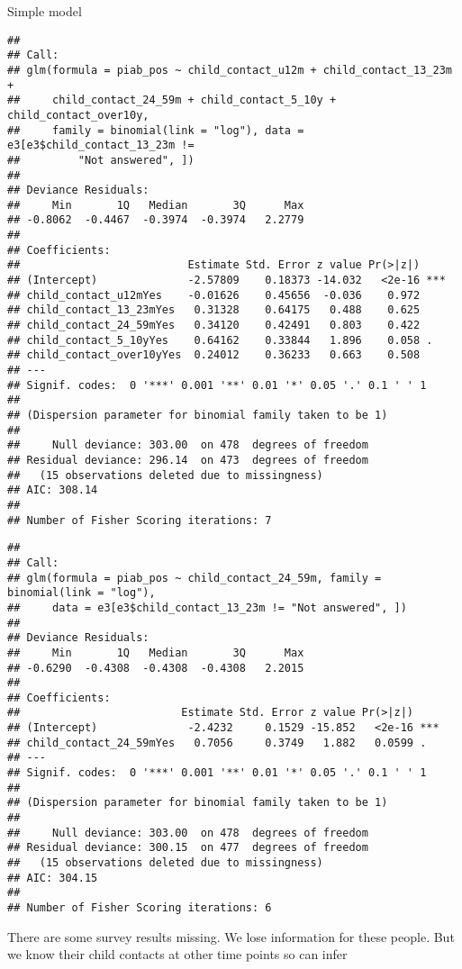 \documentclass[
]{article}
\begin{document}
Simple model

\begin{verbatim}
## 
## Call:
## glm(formula = piab_pos ~ child_contact_u12m + child_contact_13_23m + 
##     child_contact_24_59m + child_contact_5_10y + child_contact_over10y, 
##     family = binomial(link = "log"), data = e3[e3$child_contact_13_23m != 
##         "Not answered", ])
## 
## Deviance Residuals: 
##     Min       1Q   Median       3Q      Max  
## -0.8062  -0.4467  -0.3974  -0.3974   2.2779  
## 
## Coefficients:
##                          Estimate Std. Error z value Pr(>|z|)    
## (Intercept)              -2.57809    0.18373 -14.032   <2e-16 ***
## child_contact_u12mYes    -0.01626    0.45656  -0.036    0.972    
## child_contact_13_23mYes   0.31328    0.64175   0.488    0.625    
## child_contact_24_59mYes   0.34120    0.42491   0.803    0.422    
## child_contact_5_10yYes    0.64162    0.33844   1.896    0.058 .  
## child_contact_over10yYes  0.24012    0.36233   0.663    0.508    
## ---
## Signif. codes:  0 '***' 0.001 '**' 0.01 '*' 0.05 '.' 0.1 ' ' 1
## 
## (Dispersion parameter for binomial family taken to be 1)
## 
##     Null deviance: 303.00  on 478  degrees of freedom
## Residual deviance: 296.14  on 473  degrees of freedom
##   (15 observations deleted due to missingness)
## AIC: 308.14
## 
## Number of Fisher Scoring iterations: 7
\end{verbatim}

\begin{verbatim}
## 
## Call:
## glm(formula = piab_pos ~ child_contact_24_59m, family = binomial(link = "log"), 
##     data = e3[e3$child_contact_13_23m != "Not answered", ])
## 
## Deviance Residuals: 
##     Min       1Q   Median       3Q      Max  
## -0.6290  -0.4308  -0.4308  -0.4308   2.2015  
## 
## Coefficients:
##                         Estimate Std. Error z value Pr(>|z|)    
## (Intercept)              -2.4232     0.1529 -15.852   <2e-16 ***
## child_contact_24_59mYes   0.7056     0.3749   1.882   0.0599 .  
## ---
## Signif. codes:  0 '***' 0.001 '**' 0.01 '*' 0.05 '.' 0.1 ' ' 1
## 
## (Dispersion parameter for binomial family taken to be 1)
## 
##     Null deviance: 303.00  on 478  degrees of freedom
## Residual deviance: 300.15  on 477  degrees of freedom
##   (15 observations deleted due to missingness)
## AIC: 304.15
## 
## Number of Fisher Scoring iterations: 6
\end{verbatim}

There are some survey results missing. We lose information for these
people. But we know their child contacts at other time points so can
infer
\end{document}
